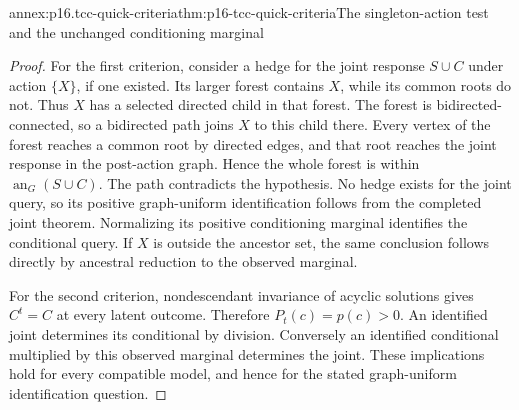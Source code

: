 \begin{annexitem}{annex:p16.tcc-quick-criteria}{thm:p16-tcc-quick-criteria}{The singleton-action test and the unchanged conditioning marginal}
\begin{proof}
For the first criterion, consider a hedge for the joint response
\(S\cup C\) under action \(\{X\}\), if one existed.
Its larger forest contains \(X\), while its common roots do
not. Thus \(X\) has a selected directed child in that forest.
The forest is bidirected-connected, so a bidirected path joins
\(X\) to this child there. Every vertex of the forest reaches
a common root by directed edges, and that root reaches the joint
response in the post-action graph. Hence the whole forest is
within \(\operatorname{an}_G(S\cup C)\). The path contradicts
the hypothesis. No hedge exists for the joint query, so its
positive graph-uniform identification follows from the completed
joint theorem. Normalizing its positive conditioning marginal
identifies the conditional query. If \(X\) is outside the
ancestor set, the same conclusion follows directly by ancestral
reduction to the observed marginal.

For the second criterion, nondescendant invariance of acyclic
solutions gives \(C^t=C\) at every latent outcome. Therefore
\(P_t(c)=p(c)>0\). An identified joint determines its conditional
by division. Conversely an identified conditional multiplied by
this observed marginal determines the joint. These implications
hold for every compatible model, and hence for the stated
graph-uniform identification question.
\end{proof}
\end{annexitem}

